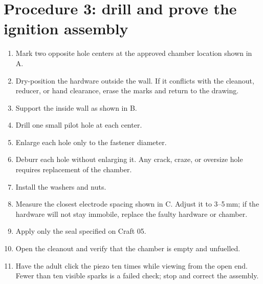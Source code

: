 \section{Procedure 3: drill and prove the ignition assembly}
\begin{center}
\end{center}

\begin{enumerate}
\item Mark two opposite hole centers at the approved chamber location shown in A.
\item Dry-position the hardware outside the wall. If it conflicts with the
cleanout, reducer, or hand clearance, erase the marks and return to the drawing.
\item Support the inside wall as shown in B.
\item Drill one small pilot hole at each center.
\item Enlarge each hole only to the fastener diameter.
\item Deburr each hole without enlarging it. Any crack, craze, or oversize hole
requires replacement of the chamber.
\item Install the washers and nuts.
\item Measure the closest electrode spacing shown in C. Adjust it to 3--5\,mm;
if the hardware will not stay immobile, replace the faulty hardware or chamber.
\item Apply only the seal specified on Craft 05.
\item Open the cleanout and verify that the chamber is empty and unfuelled.
\item Have the adult click the piezo ten times while viewing from the open end.
Fewer than ten visible sparks is a failed check; stop and correct the assembly.
\end{enumerate}

